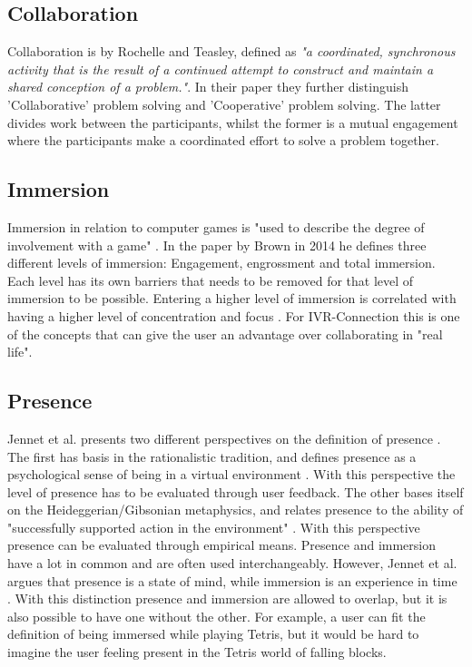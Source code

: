         \subsection{Collaboration}
            Collaboration is by Rochelle and Teasley, defined as \emph{"a coordinated, synchronous activity that is the result of a continued attempt to construct and maintain a shared conception of a problem."}\cite{Roschelle1995}. In their paper they further distinguish 'Collaborative' problem solving and 'Cooperative' problem solving. The latter divides work between the participants, whilst the former is a mutual engagement where the participants make a coordinated effort to solve a problem together. \cite{Roschelle1995} 
            
        \subsection{Immersion} %
            Immersion in relation to computer games is "used to describe the degree of involvement with a game" \cite{Brown2004}. In the paper by Brown in 2014 he defines three different levels of immersion: Engagement, engrossment and total immersion. Each level has its own barriers that needs to be removed for that level of immersion to be possible. Entering a higher level of immersion is correlated with having a higher level of concentration and focus \cite{Jennett2008}. For IVR-Connection this is one of the concepts that can give the user an advantage over collaborating in "real life".
        
        \subsection{Presence} %
            Jennet et al. presents two different perspectives on the definition of presence \cite{Jennett2008}. The first has basis in the rationalistic tradition, and defines presence as a psychological sense of being in a virtual environment \cite{Slater1994}. With this perspective the level of presence has to be evaluated through user feedback. The other bases itself on the Heideggerian/Gibsonian metaphysics, and relates presence to the ability of "successfully supported action in the environment" \cite{Zahorik1998}. With this perspective presence can be evaluated through empirical means. Presence and immersion have a lot in common and are often used interchangeably. However, Jennet et al. argues that presence is a state of mind, while immersion is an experience in time \cite{Jennett2008}. With this distinction presence and immersion are allowed to overlap, but it is also possible to have one without the other. For example, a user can fit the definition of being immersed while playing Tetris, but it would be hard to imagine the user feeling present in the Tetris world of falling blocks. \cite{Jennett2008}
    

